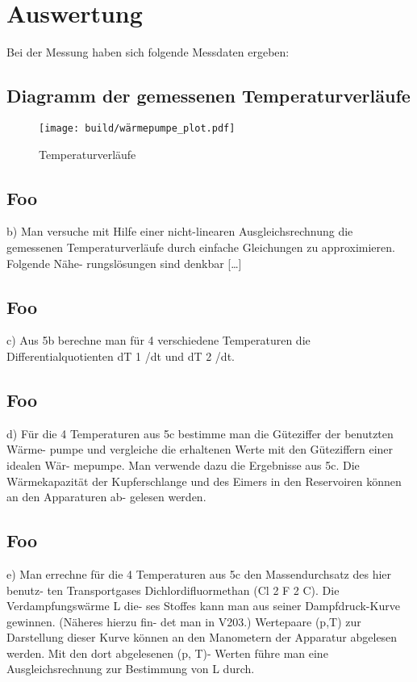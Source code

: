 \section{Auswertung} \label{sec:Auswertung}
    Bei der Messung haben sich folgende Messdaten ergeben:
    

\subsection{Diagramm der gemessenen Temperaturverläufe}

\begin{figure}
  \centering
  \texttt{[image: build/wärmepumpe\_plot.pdf]}
  \caption{Temperaturverläufe}
  \label{fig:plot}
\end{figure}

\subsection{Foo}
b) Man versuche mit Hilfe einer nicht-linearen Ausgleichsrechnung die gemessenen
Temperaturverläufe durch einfache Gleichungen zu approximieren. Folgende Nähe-
rungslösungen sind denkbar […]

\subsection{Foo}
c) Aus 5b berechne man für 4 verschiedene Temperaturen die Differentialquotienten
dT 1 /dt und dT 2 /dt.

\subsection{Foo}
d) Für die 4 Temperaturen aus 5c bestimme man die Güteziffer der benutzten Wärme-
pumpe und vergleiche die erhaltenen Werte mit den Güteziffern einer idealen Wär-
mepumpe. Man verwende dazu die Ergebnisse aus 5c. Die Wärmekapazität der
Kupferschlange und des Eimers in den Reservoiren können an den Apparaturen ab-
gelesen werden.

\subsection{Foo}
e) Man errechne für die 4 Temperaturen aus 5c den Massendurchsatz des hier benutz-
ten Transportgases Dichlordifluormethan (Cl 2 F 2 C). Die Verdampfungswärme L die-
ses Stoffes kann man aus seiner Dampfdruck-Kurve gewinnen. (Näheres hierzu fin-
det man in V203.) Wertepaare (p,T) zur Darstellung dieser Kurve können an den
Manometern der Apparatur abgelesen werden. Mit den dort abgelesenen (p, T)-
Werten führe man eine Ausgleichsrechnung zur Bestimmung von L durch.

